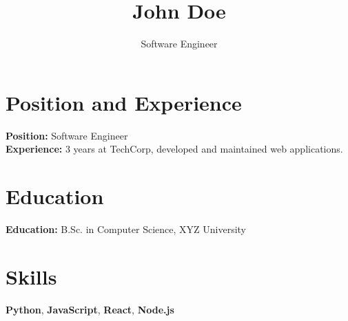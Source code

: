 \documentclass{article}
\title{John Doe}
\author{Software Engineer}
\begin{document}
\maketitle

\section{Position and Experience}
\textbf{Position:} Software Engineer\\
\textbf{Experience:} 3 years at TechCorp, developed and maintained web applications.

\section{Education}
\textbf{Education:} B.Sc. in Computer Science, XYZ University

\section{Skills}
\textbf{Python}, \textbf{JavaScript}, \textbf{React}, \textbf{Node.js}
\end{document}
